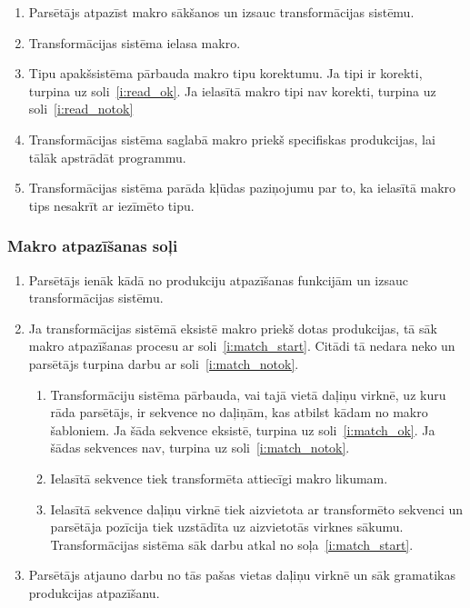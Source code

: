 \begin{enumerate}
\item
Parsētājs atpazīst makro sākšanos un izsauc transformācijas sistēmu.
\item
Transformācijas sistēma ielasa makro.
\item
Tipu apakšsistēma pārbauda makro tipu korektumu. Ja tipi ir korekti, turpina uz soli~\ref{i:read_ok}. Ja ielasītā makro tipi nav korekti, turpina uz soli~\ref{i:read_notok}
\item \label{i:read_ok}
Transformācijas sistēma saglabā makro priekš specifiskas produkcijas, lai tālāk apstrādāt programmu.
\item \label{i:read_notok}
Transformācijas sistēma parāda kļūdas paziņojumu par to, ka ielasītā makro tips nesakrīt ar iezīmēto tipu.
\end{enumerate}

\subsubsection{Makro atpazīšanas soļi}

\begin{enumerate}
\item
Parsētājs ienāk kādā no produkciju atpazīšanas funkcijām un izsauc transformācijas sistēmu.
\item
Ja transformācijas sistēmā eksistē makro priekš dotas produkcijas, tā sāk makro atpazīšanas procesu ar soli~\ref{i:match_start}. Citādi tā nedara neko un parsētājs turpina darbu ar soli~\ref{i:match_notok}.
\begin{enumerate}
\item \label{i:match_start}
Transformāciju sistēma pārbauda, vai tajā vietā daļiņu virknē, uz kuru rāda parsētājs, ir sekvence no daļiņām, kas atbilst kādam no makro šabloniem. Ja šāda sekvence eksistē, turpina uz soli~\ref{i:match_ok}. Ja šādas sekvences nav, turpina uz soli~\ref{i:match_notok}.
\item \label{i:match_ok}
Ielasītā sekvence tiek transformēta attiecīgi makro likumam.
\item
Ielasītā sekvence daļiņu virknē tiek aizvietota ar transformēto sekvenci un parsētāja pozīcija tiek uzstādīta uz aizvietotās virknes sākumu. Transformācijas sistēma sāk darbu atkal no soļa~\ref{i:match_start}.
\end{enumerate}
\item \label{i:match_notok}
Parsētājs atjauno darbu no tās pašas vietas daļiņu virknē un sāk gramatikas produkcijas atpazīšanu. %
\end{enumerate}

